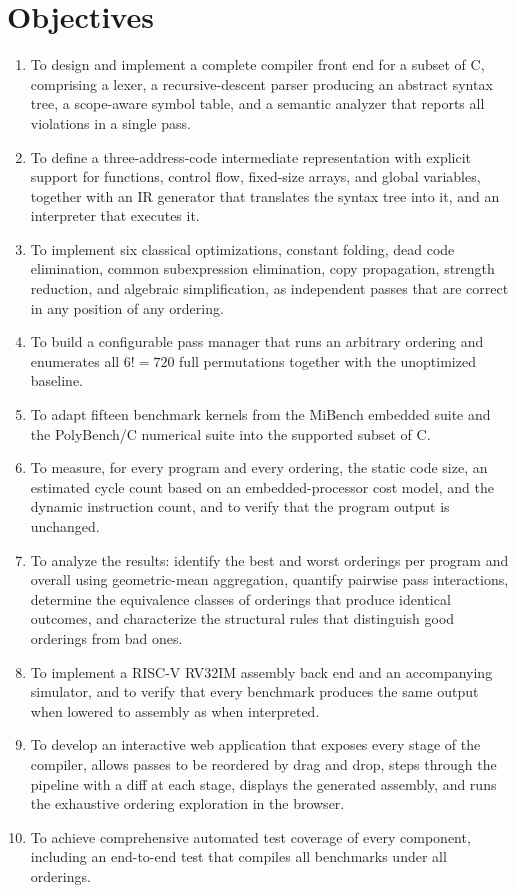 \section{Objectives}

\begin{enumerate}
  \item To design and implement a complete compiler front end for a subset of C, comprising a lexer, a recursive-descent parser producing an abstract syntax tree, a scope-aware symbol table, and a semantic analyzer that reports all violations in a single pass.
  \item To define a three-address-code intermediate representation with explicit support for functions, control flow, fixed-size arrays, and global variables, together with an IR generator that translates the syntax tree into it, and an interpreter that executes it.
  \item To implement six classical optimizations, constant folding, dead code elimination, common subexpression elimination, copy propagation, strength reduction, and algebraic simplification, as independent passes that are correct in any position of any ordering.
  \item To build a configurable pass manager that runs an arbitrary ordering and enumerates all $6! = 720$ full permutations together with the unoptimized baseline.
  \item To adapt fifteen benchmark kernels from the MiBench embedded suite and the PolyBench/C numerical suite into the supported subset of C.
  \item To measure, for every program and every ordering, the static code size, an estimated cycle count based on an embedded-processor cost model, and the dynamic instruction count, and to verify that the program output is unchanged.
  \item To analyze the results: identify the best and worst orderings per program and overall using geometric-mean aggregation, quantify pairwise pass interactions, determine the equivalence classes of orderings that produce identical outcomes, and characterize the structural rules that distinguish good orderings from bad ones.
  \item To implement a RISC-V RV32IM assembly back end and an accompanying simulator, and to verify that every benchmark produces the same output when lowered to assembly as when interpreted.
  \item To develop an interactive web application that exposes every stage of the compiler, allows passes to be reordered by drag and drop, steps through the pipeline with a diff at each stage, displays the generated assembly, and runs the exhaustive ordering exploration in the browser.
  \item To achieve comprehensive automated test coverage of every component, including an end-to-end test that compiles all benchmarks under all orderings.
\end{enumerate}

